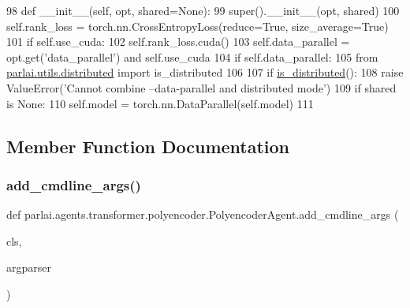 \begin{DoxyCode}
98     \textcolor{keyword}{def }\_\_init\_\_(self, opt, shared=None):
99         super().\_\_init\_\_(opt, shared)
100         self.rank\_loss = torch.nn.CrossEntropyLoss(reduce=\textcolor{keyword}{True}, size\_average=\textcolor{keyword}{True})
101         \textcolor{keywordflow}{if} self.use\_cuda:
102             self.rank\_loss.cuda()
103         self.data\_parallel = opt.get(\textcolor{stringliteral}{'data\_parallel'}) \textcolor{keywordflow}{and} self.use\_cuda
104         \textcolor{keywordflow}{if} self.data\_parallel:
105             \textcolor{keyword}{from} \hyperlink{namespaceparlai_1_1utils_1_1distributed}{parlai.utils.distributed} \textcolor{keyword}{import} is\_distributed
106 
107             \textcolor{keywordflow}{if} \hyperlink{namespaceparlai_1_1utils_1_1distributed_a023acb5e3b66e1f27e21247c35661279}{is\_distributed}():
108                 \textcolor{keywordflow}{raise} ValueError(\textcolor{stringliteral}{'Cannot combine --data-parallel and distributed mode'})
109             \textcolor{keywordflow}{if} shared \textcolor{keywordflow}{is} \textcolor{keywordtype}{None}:
110                 self.model = torch.nn.DataParallel(self.model)
111 
\end{DoxyCode}


\subsection{Member Function Documentation}
\mbox{\label{classparlai_1_1agents_1_1transformer_1_1polyencoder_1_1PolyencoderAgent_adbbf75b4d5b32529621ab9f6edbb904f}} 
\subsubsection{\texorpdfstring{add\+\_\+cmdline\+\_\+args()}{add\_cmdline\_args()}}
{\footnotesize\ttfamily def parlai.\+agents.\+transformer.\+polyencoder.\+Polyencoder\+Agent.\+add\+\_\+cmdline\+\_\+args (\begin{DoxyParamCaption}\item[{}]{cls,  }\item[{}]{argparser }\end{DoxyParamCaption})}


